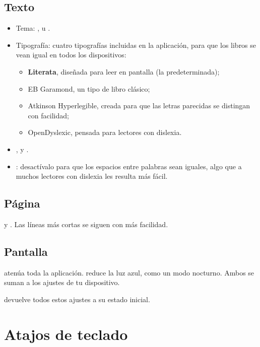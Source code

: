 \documentclass[11pt]{article}
\begin{document}
\subsection{Texto}
\begin{itemize}
  \item Tema: ,  u .
  \item Tipografía: cuatro tipografías incluidas en la aplicación, para que los libros se vean
        igual en todos los dispositivos:
  \begin{itemize}
    \item \textbf{Literata}, diseñada para leer en pantalla (la predeterminada);
    \item {\garamondfont EB Garamond}, un tipo de libro clásico;
    \item {\sffamily Atkinson Hyperlegible}, creada para que las letras parecidas se distingan
          con facilidad;
    \item {\dyslexicfont OpenDyslexic}, pensada para lectores con dislexia.
  \end{itemize}
  \item {},  y .
  \item {}: desactívalo para que los espacios entre palabras sean iguales,
        algo que a muchos lectores con dislexia les resulta más fácil.
\end{itemize}

\subsection{Página}
 y . Las líneas más cortas se siguen con más facilidad.

\subsection{Pantalla}
 atenúa toda la aplicación.  reduce la luz azul, como un modo nocturno.
Ambos se suman a los ajustes de tu dispositivo.

 devuelve todos estos ajustes a su estado inicial.

\section{Atajos de teclado}
\end{document}
